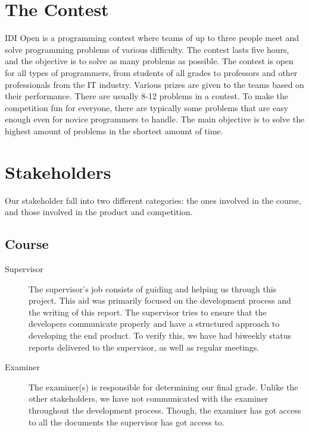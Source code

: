 \section{The Contest}
IDI Open is a programming contest where teams of up to three people meet
and solve programming problems of various difficulty. The contest lasts
five hours, and the objective is to solve as many problems as possible.
The contest is open for all types of programmers, from students of all
grades to professors and other professionals from the IT industry.
Various prizes are given to the teams based on their performance. There
are usually 8-12 problems in a contest. To make the competition fun for
everyone, there are typically some problems that are easy enough even
for novice programmers to handle. The main objective is to solve the
highest amount of problems in the shortest amount of time.

\section{Stakeholders}
Our stakeholder fall into two different categories: the ones involved in
the course, and those involved in the product and competition.

\subsection{Course}
\begin{description}
\item[Supervisor]
The supervisor's job consists of guiding and helping us
through this project. This aid was primarily focused on the development
process and the writing of this report. The supervisor tries to ensure
that the developers communicate properly and have a structured approach
to developing the end product. To verify this, we have had biweekly
status reports delivered to the supervisor, as well as regular
meetings.

\item[Examiner]
The examiner(s) is responsible for determining our final grade. Unlike
the other stakeholders, we have not communicated with the examiner
throughout the development process. Though, the examiner has got access
to all the documents the supervisor has got access to.
\end{description}

